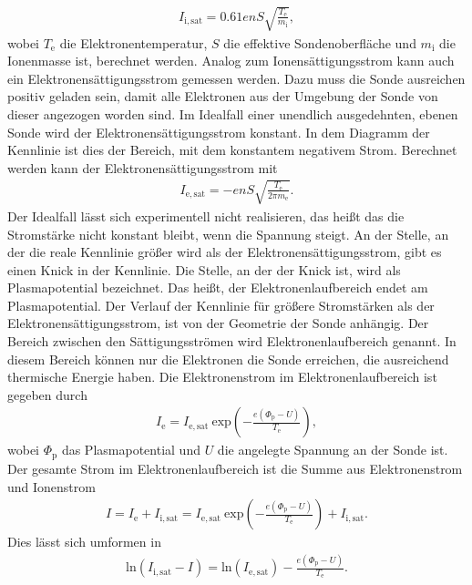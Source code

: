 \begin{align}
 I_{\mathrm{i},\mathrm{sat}}=0.61enS \sqrt{\frac{T_\mathrm{e}}{m_{\mathrm{i}}}},
\end{align} 
 wobei $T_{\mathrm{e}}$ die Elektronentemperatur, $S$ die effektive Sondenoberfläche und $m_{\mathrm{i}}$ die Ionenmasse ist, berechnet werden. Analog zum Ionensättigungsstrom kann auch ein Elektronensättigungsstrom gemessen werden. Dazu muss die Sonde ausreichen positiv geladen sein, damit alle Elektronen aus der Umgebung der Sonde von dieser angezogen worden sind. Im Idealfall einer unendlich ausgedehnten, ebenen Sonde wird der Elektronensättigungsstrom konstant. In dem Diagramm der Kennlinie ist dies der Bereich, mit dem konstantem negativem Strom. Berechnet werden kann der Elektronensättigungsstrom mit
\begin{align}
I_{\mathrm{e},\mathrm{sat}}=-enS \sqrt{\frac{T_{\mathrm{e}}}{2\pi m_{\mathrm{e}}}}.
\label{eq:Ionensättigungsstrom}
\end{align}
Der Idealfall lässt sich experimentell nicht realisieren, das heißt das die Stromstärke nicht konstant bleibt, wenn die Spannung steigt. An der Stelle, an der die reale Kennlinie größer wird als der Elektronensättigungsstrom, gibt es einen Knick in der Kennlinie. Die Stelle, an der der Knick ist, wird als Plasmapotential bezeichnet. Das heißt, der Elektronenlaufbereich endet am Plasmapotential. Der Verlauf der Kennlinie für größere Stromstärken als der Elektronensättigungsstrom, ist von der Geometrie der Sonde anhängig. Der Bereich zwischen den Sättigungsströmen wird Elektronenlaufbereich genannt. In diesem Bereich können nur die Elektronen die Sonde erreichen, die  ausreichend thermische Energie haben. Die Elektronenstrom im Elektronenlaufbereich ist gegeben durch
\begin{align}
I_{\mathrm{e}}=I_{\mathrm{e},\mathrm{sat}}\ \mathrm{exp} \left( -\frac{e(\Phi_{\mathrm{p}}-U)}{T_{\mathrm{e}}} \right),
\label{eq:Elektronenlaufbereich}
\end{align}
wobei $\Phi_{\mathrm{p}}$ das Plasmapotential und $U$ die angelegte Spannung an der Sonde ist. Der gesamte Strom im Elektronenlaufbereich ist die Summe aus Elektronenstrom und Ionenstrom
\begin{align}
I=I_{\mathrm{e}} +  I_{\mathrm{i},\mathrm{sat}}=  I_{\mathrm{e},\mathrm{sat}}\ \mathrm{exp} \left( -\frac{e(\Phi_{\mathrm{p}}-U)}{T_{\mathrm{e}}} \right) + I_{\mathrm{i},\mathrm{sat}}.
\end{align}
Dies lässt sich umformen in
\begin{align}
\mathrm{ln}(I_{\mathrm{i},\mathrm{sat}} -I) = \mathrm{ln}(I_{\mathrm{e},\mathrm{sat}}) - \frac{e(\Phi_{\mathrm{p}}-U)}{T_{\mathrm{e}}}.
\end{align}
